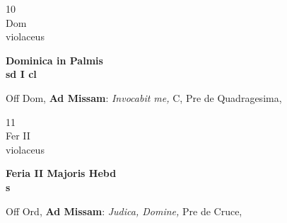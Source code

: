 \documentclass[10pt, openany]{book}
\begin{document}
        \begin{center}
            \begin{minipage}{3.5in}
                \vspace{2em}
                \begin{minipage}{0.5in}
                    {\Huge 10} \\
                    {\normalsize Dom} \\
                    {\normalsize violaceus}
                \end{minipage}
                \begin{minipage}{3.0in}
                    \textbf{ \large Dominica in Palmis \\
                    \textnormal{\normalsize sd I cl}} \\ 
                \end{minipage}
                \begin{justify}Off Dom, \textbf{Ad Missam}: \textit{Invocabit me,} C, Pre de Quadragesima,  
                \end{justify}
            \end{minipage}
        \end{center}
    
        \begin{center}
            \begin{minipage}{3.5in}
                \vspace{2em}
                \begin{minipage}{0.5in}
                    {\Huge 11} \\
                    {\normalsize Fer II} \\
                    {\normalsize violaceus}
                \end{minipage}
                \begin{minipage}{3.0in}
                    \textbf{ \large Feria II Majoris Hebd \\
                    \textnormal{\normalsize s}} \\ 
                \end{minipage}
                \begin{justify}Off Ord, \textbf{Ad Missam}: \textit{Judica, Domine,} Pre de Cruce,  
                \end{justify}
            \end{minipage}
        \end{center}
    
\end{document}

